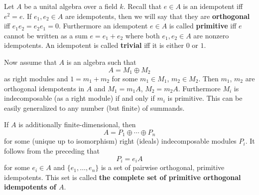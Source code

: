 \documentclass[12pt]{article}
\begin{document}
Let $A$ be a unital algebra over a field $k$. Recall that $e\in A$ is an idempotent iff $e^2=e$. If $e_1,e_2\in A$ are idempotents, then we will say that they are \textbf{orthogonal} iff $e_1e_2=e_2e_1=0$. Furthermore an idempotent $e\in A$ is called \textbf{primitive} iff $e$ cannot be written as a sum $e=e_1+e_2$ where both $e_1,e_2\in A$ are nonzero idempotents. An idempotent is called \textbf{trivial} iff it is either $0$ or $1$.

Now assume that $A$ is an algebra such that
$$A=M_1\oplus M_2$$
as right modules and $1=m_1+m_2$ for some $m_1\in M_1$, $m_2\in M_2$. Then $m_1$, $m_2$ are orthogonal idempotents in $A$ and $M_1=m_1A$, $M_2=m_2A$. Furthermore $M_i$ is indecomposable (as a right module) if and only if $m_i$ is primitive. This can be easily generalized to any number (but finite) of summands.

If $A$ is additionally finite-dimensional, then
$$A=P_1\oplus\cdots\oplus P_n$$
for some (unique up to isomorphism) right (ideals) indecomposable modules $P_i$. It follows from the preceding that
$$P_i=e_iA$$
for some $e_i\in A$ and $\{e_1,\ldots,e_n\}$ is a set of pairwise orthogonal, primitive idempotents. This set is called \textbf{the complete set of primitive orthogonal idempotents of $A$}.
\end{document}
